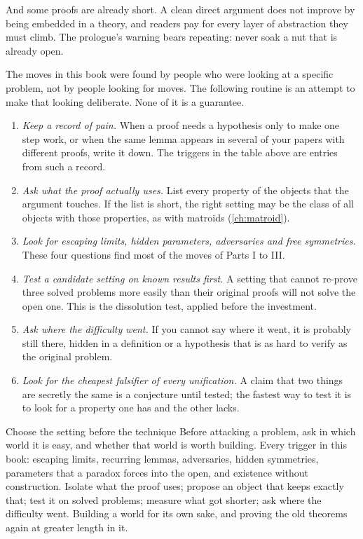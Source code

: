 \begin{refsection}
And some proofs are already short. A clean direct argument does not improve by being embedded in a theory, and readers pay for every layer of abstraction they must climb. The prologue's warning bears repeating: never soak a nut that is already open.


The moves in this book were found by people who were looking at a specific problem, not by people looking for moves. The following routine is an attempt to make that looking deliberate. None of it is a guarantee.

\begin{enumerate}[label=\arabic*.,leftmargin=*]
\item \emph{Keep a record of pain.} When a proof needs a hypothesis only to make one step work, or when the same lemma appears in several of your papers with different proofs, write it down. The triggers in the table above are entries from such a record.
\item \emph{Ask what the proof actually uses.} List every property of the objects that the argument touches. If the list is short, the right setting may be the class of all objects with those properties, as with matroids (\cref{ch:matroid}).
\item \emph{Look for escaping limits, hidden parameters, adversaries and free symmetries.} These four questions find most of the moves of Parts I to III.
\item \emph{Test a candidate setting on known results first.} A setting that cannot re-prove three solved problems more easily than their original proofs will not solve the open one. This is the dissolution test, applied before the investment.
\item \emph{Ask where the difficulty went.} If you cannot say where it went, it is probably still there, hidden in a definition or a hypothesis that is as hard to verify as the original problem.
\item \emph{Look for the cheapest falsifier of every unification.} A claim that two things are secretly the same is a conjecture until tested; the fastest way to test it is to look for a property one has and the other lacks.
\end{enumerate}

\begin{move}{Choose the setting before the technique}
 Before attacking a problem, ask in which world it is easy, and whether that world is worth building.
 Every trigger in this book: escaping limits, recurring lemmas, adversaries, hidden symmetries, parameters that a paradox forces into the open, and existence without construction.
 Isolate what the proof uses; propose an object that keeps exactly that; test it on solved problems; measure what got shorter; ask where the difficulty went.
 Building a world for its own sake, and proving the old theorems again at greater length in it.
\end{move}


\end{refsection}

